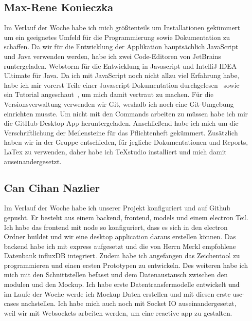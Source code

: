 \documentclass[]{article}
\begin{document}
\subsection{Max-Rene Konieczka}
Im Verlauf der Woche habe ich mich größtenteils um Installationen gekümmert um ein geeignetes Umfeld für die Programmierung sowie Dokumentation zu schaffen. Da wir für die Entwicklung der Applikation hauptsächlich JavaScript und Java verwenden werden, habe ich zwei Code-Editoren von JetBrains runtergeladen. Webstorm für die Entwicklung in Javascript und IntelliJ IDEA Ultimate für Java. Da ich mit JavaScript noch nicht allzu viel Erfahrung habe, habe ich mir vorerst Teile einer Javascript-Dokumentation durchgelesen~\cite{javascript_doc} sowie ein Tutorial angeschaut~\cite{javascript_tut}, um mich damit vertraut zu machen.
Für die Versionsverwaltung verwenden wir Git, weshalb ich noch eine Git-Umgebung einrichten musste. Um nicht mit den Commands arbeiten zu müssen habe ich mir die GitHub-Desktop App heruntergeladen. 
Anschließend habe ich mich um die Verschriftlichung der Meilensteine für das Pflichtenheft gekümmert. Zusätzlich haben wir in der Gruppe entschieden, für jegliche Dokumentationen und Reports, LaTex zu verwenden, daher habe ich TeXstudio installiert und mich damit auseinandergesetzt. 

\subsection{Can Cihan Nazlier}
Im Verlauf der Woche habe ich unserer Projekt konfiguriert und auf Github gepusht. Er besteht aus einem backend, frontend, models und einem electron Teil. Ich habe das frontend mit node so konfiguriert, dass es sich in den electron Ordner buildet und wir eine desktop application daraus erstellen können. Das backend habe ich mit express aufgesetzt und die von Herrn Merkl empfohlene Datenbank influxDB integriert. Zudem habe ich angefangen das Zeichentool zu programmieren und einen ersten Prototypen zu entwickeln. Des weiteren habe ich mich mit den Schnittstellen befasst und dem Datenaustausch zwischen den modulen und den Mockup. Ich habe erste Datentransfermodelle entwickelt und im Laufe der Woche werde ich Mockup Daten erstellen und mit diesen erste use-cases nachstellen. Ich habe mich auch noch mit Socket IO auseinandergesetzt, weil wir mit Websockets arbeiten werden, um eine reactive app zu gestalten.

\printbibliography
\end{document}
